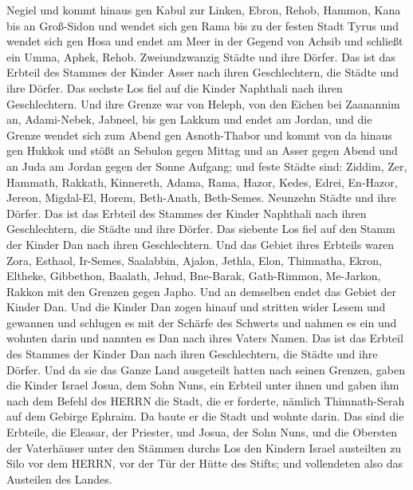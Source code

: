 Negiel und kommt hinaus gen Kabul zur Linken,  Ebron,
Rehob, Hammon, Kana bis an Groß-Sidon  und wendet sich gen
Rama bis zu der festen Stadt Tyrus und wendet sich gen Hosa und endet am
Meer in der Gegend von Achsib  und schließt ein Umma,
Aphek, Rehob. Zweiundzwanzig Städte und ihre Dörfer.  Das
ist das Erbteil des Stammes der Kinder Asser nach ihren Geschlechtern,
die Städte und ihre Dörfer.  Das sechste Los fiel auf die
Kinder Naphthali nach ihren Geschlechtern.  Und ihre Grenze
war von Heleph, von den Eichen bei Zaanannim an, Adami-Nebek, Jabneel,
bis gen Lakkum und endet am Jordan,  und die Grenze wendet
sich zum Abend gen Asnoth-Thabor und kommt von da hinaus gen Hukkok und
stößt an Sebulon gegen Mittag und an Asser gegen Abend und an Juda am
Jordan gegen der Sonne Aufgang;  und feste Städte sind:
Ziddim, Zer, Hammath, Rakkath, Kinnereth,  Adama, Rama,
Hazor,  Kedes, Edrei, En-Hazor,  Jereon,
Migdal-El, Horem, Beth-Anath, Beth-Semes. Neunzehn Städte und ihre
Dörfer.  Das ist das Erbteil des Stammes der Kinder
Naphthali nach ihren Geschlechtern, die Städte und ihre Dörfer.
 Das siebente Los fiel auf den Stamm der Kinder Dan nach
ihren Geschlechtern.  Und das Gebiet ihres Erbteils waren
Zora, Esthaol, Ir-Semes,  Saalabbin, Ajalon, Jethla,
 Elon, Thimnatha, Ekron,  Eltheke, Gibbethon,
Baalath,  Jehud, Bne-Barak, Gath-Rimmon, 
Me-Jarkon, Rakkon mit den Grenzen gegen Japho.  Und an
demselben endet das Gebiet der Kinder Dan. Und die Kinder Dan zogen
hinauf und stritten wider Lesem und gewannen und schlugen es mit der
Schärfe des Schwerts und nahmen es ein und wohnten darin und nannten es
Dan nach ihres Vaters Namen.  Das ist das Erbteil des
Stammes der Kinder Dan nach ihren Geschlechtern, die Städte und ihre
Dörfer.  Und da sie das Ganze Land ausgeteilt hatten nach
seinen Grenzen, gaben die Kinder Israel Josua, dem Sohn Nuns, ein
Erbteil unter ihnen  und gaben ihm nach dem Befehl des
HERRN die Stadt, die er forderte, nämlich Thimnath-Serah auf dem Gebirge
Ephraim. Da baute er die Stadt und wohnte darin.  Das sind
die Erbteile, die Eleasar, der Priester, und Josua, der Sohn Nuns, und
die Obersten der Vaterhäuser unter den Stämmen durchs Los den Kindern
Israel austeilten zu Silo vor dem HERRN, vor der Tür der Hütte des
Stifts; und vollendeten also das Austeilen des Landes.

